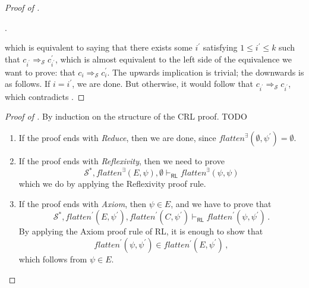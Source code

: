 \documentclass{article}
\newcommand{\RL}{\mathsf{RL}}
\begin{document}
\begin{proof}[Proof of ]
\begin{itemize}
    .
\end{itemize}
which is equivalent to saying that there exists some $i^\prime$ satisfying $1 \leq i^\prime \leq k$
such that $c_{i^\prime} \Rightarrow_{\mathcal{S}} c^\prime_{i^\prime}$,
which is almost equivalent to the left side of the equivalence we want to prove:
that $c_{i} \Rightarrow_{\mathcal{S}} c^\prime_{i}$.
The upwards implication is trivial; the downwards is as follows. If $i = i^\prime$, we are done.
But otherwise, it would follow that $c_{i^\prime} \Rightarrow_{\mathcal{S}} c_{i^\prime}$,
which contradicts .
\end{proof}


\begin{proof}[Proof of ]
By induction on the structure of the CRL proof. TODO
\begin{enumerate}
    \item If the proof ends with \emph{Reduce}, then we are done, since $\mathit{flatten}^\exists(\emptyset, \psi^\prime) = \emptyset$.
    
    \item If the proof ends with \emph{Reflexivity}, then we need to prove
    \begin{equation*}
        \mathcal{S}^*, \mathit{flatten}^\exists(E, \psi), \emptyset \vdash_\RL
          \mathit{flatten}^\exists(\psi, \psi) 
    \end{equation*}
    which we do by applying the Reflexivity proof rule.
    
    \item If the proof ends with \emph{Axiom}, then $\psi \in E$,
          and we have to prove that
          \begin{equation*}
            \mathcal{S}^*, \mathit{flatten}^\prime(E, \psi^\prime), \mathit{flatten}^\prime(C, \psi^\prime) \vdash_\RL
            \mathit{flatten}^\prime(\psi, \psi^\prime)               \, .
          \end{equation*}
          By applying the Axiom proof rule of RL, it is enough to show that
          \begin{equation*}
              \mathit{flatten}^\prime(\psi, \psi^\prime) \in \mathit{flatten^\prime}(E, \psi^\prime) \, ,
          \end{equation*}
          which follows from $\psi \in E$.
          

\end{enumerate}
\end{proof}
\end{document}

